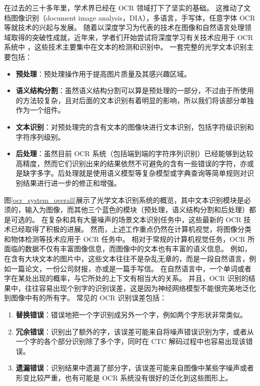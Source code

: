 在过去的三十多年里，学术界已经在 OCR 领域打下了坚实的基础。
这推动了文档图像识别（document image analysis，DIA），多语言，手写体，任意字体 OCR 等就技术的兴起与发展。
随着以深度学习为代表的技术在图像和自然语言处理领域取得的突破性成就，近年来，学者们开始尝试将深度学习有关技术应用于 OCR 系统中 \cite{CRNN,MFCNN,SEE,CTPN}，这些技术主要集中在文本的检测和识别中。
一套完整的光学文本识别主要包括：

\begin{itemize}
	\item \textbf{预处理}：预处理操作用于提高图片质量及其感兴趣区域。
	\item \textbf{语义结构分割}：虽然语义结构分割可以算是预处理的一部分，不过由于所使用的方法较复杂，且对后面的文本识别有着明显的影响，所以我们将该部分单独作为一个组件。
	\item \textbf{文本识别}：对预处理完的含有文本的图像块进行文本识别，包括字符级识别和字符序列级别。
	\item \textbf{后处理}：虽然目前 OCR 系统（包括端到端的字符序列识别）已经能够到达较高精度，然而它们识别出来的结果依然不可避免的含有一些错误的字符，亦或是缺字多字。后处理就是使用语义模型等复杂模型或字典查询等简单规则对识别结果进行进一步的修正和增强。
\end{itemize}

图\ref{ocr_system_overall}展示了光学文本识别系统的概览，其中文本识别模块是必须的，输入为图像，而其他三个蓝色的模块（预处理，语义结构分割和后处理）都是可选的。
在复杂和具有大量噪声的场景文本识别任务中，这些最新的 OCR 技术已经取得了积极的进展。
然而，上述工作重点仍然在计算机视觉，将图像分类和物体检测等技术应用于 OCR 任务中。
相对于常规的计算机视觉任务，OCR 所面临的数据不仅有丰富图像信息，而图像中的文本也有丰富的语义信息。
例如，在含有大块文本的图片中，这些文本往往不是杂乱无章的，而是一段自然语言，例如一篇论文，一份公司财报，亦或是一篇手写信。
在自然语言中，一个单词或者字在某处出现的概率，与它所处的上下文有相当大的关系。
并且，OCR 识别的结果中，往往容易出现个别字的识别误差，这是因为神经网络模型不能很完美地泛化到图像中有的所有字。
常见的 OCR 识别误差包括：

\begin{enumerate}[(1)]
	\item \textbf{替换错误}：错误地把一个字识别成另外一个字，例如两个字形状非常类似。
	\item \textbf{冗余错误}：识别出了额外的字，该误差可能来自将噪声错误识别为字，或者从一个字的各个部分识别除了多个字，同时在 CTC 解码过程中也容易出现该错误。
	\item \textbf{遗漏错误}：识别结果中遗漏了部分字，该误差可能来自图像中某些字噪声或者形变比较严重，也有可能是 OCR 系统没有很好的泛化到这些图形上。
\end{enumerate}

